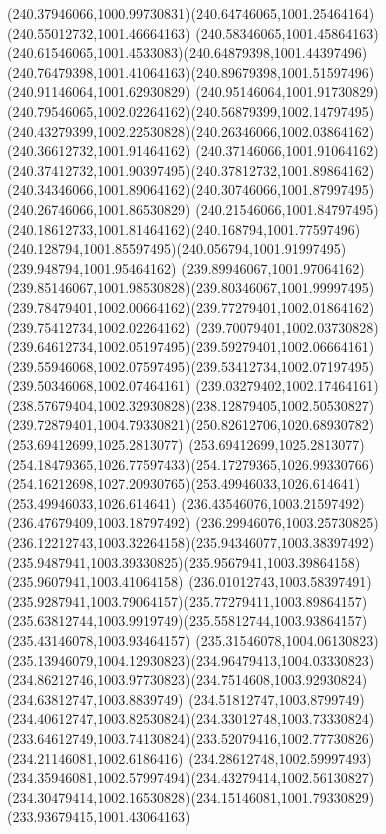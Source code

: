 {{		\curveto(240.37946066,1000.99730831)(240.64746065,1001.25464164)(240.55012732,1001.46664163)
		\curveto(240.58346065,1001.45864163)(240.61546065,1001.4533083)(240.64879398,1001.44397496)
		\curveto(240.76479398,1001.41064163)(240.89679398,1001.51597496)(240.91146064,1001.62930829)
		\curveto(240.95146064,1001.91730829)(240.79546065,1002.02264162)(240.56879399,1002.14797495)
		\curveto(240.43279399,1002.22530828)(240.26346066,1002.03864162)(240.36612732,1001.91464162)
		\curveto(240.37146066,1001.91064162)(240.37412732,1001.90397495)(240.37812732,1001.89864162)
		\curveto(240.34346066,1001.89064162)(240.30746066,1001.87997495)(240.26746066,1001.86530829)
		\curveto(240.21546066,1001.84797495)(240.18612733,1001.81464162)(240.168794,1001.77597496)
		\curveto(240.128794,1001.85597495)(240.056794,1001.91997495)(239.948794,1001.95464162)
		\curveto(239.89946067,1001.97064162)(239.85146067,1001.98530828)(239.80346067,1001.99997495)
		\curveto(239.78479401,1002.00664162)(239.77279401,1002.01864162)(239.75412734,1002.02264162)
		\curveto(239.70079401,1002.03730828)(239.64612734,1002.05197495)(239.59279401,1002.06664161)
		\curveto(239.55946068,1002.07597495)(239.53412734,1002.07197495)(239.50346068,1002.07464161)
		\curveto(239.03279402,1002.17464161)(238.57679404,1002.32930828)(238.12879405,1002.50530827)
		\curveto(239.72879401,1004.79330821)(250.82612706,1020.68930782)(253.69412699,1025.2813077)
		\curveto(253.69412699,1025.2813077)(254.18479365,1026.77597433)(254.17279365,1026.99330766)
		\curveto(254.16212698,1027.20930765)(253.49946033,1026.614641)(253.49946033,1026.614641)
		\lineto(236.43546076,1003.21597492)
		\lineto(236.47679409,1003.18797492)
		\curveto(236.29946076,1003.25730825)(236.12212743,1003.32264158)(235.94346077,1003.38397492)
		\curveto(235.9487941,1003.39330825)(235.9567941,1003.39864158)(235.9607941,1003.41064158)
		\curveto(236.01012743,1003.58397491)(235.9287941,1003.79064157)(235.77279411,1003.89864157)
		\curveto(235.63812744,1003.9919749)(235.55812744,1003.93864157)(235.43146078,1003.93464157)
		\curveto(235.31546078,1004.06130823)(235.13946079,1004.12930823)(234.96479413,1004.03330823)
		\curveto(234.86212746,1003.97730823)(234.7514608,1003.92930824)(234.63812747,1003.8839749)
		\curveto(234.51812747,1003.8799749)(234.40612747,1003.82530824)(234.33012748,1003.73330824)
		\curveto(233.64612749,1003.74130824)(233.52079416,1002.77730826)(234.21146081,1002.6186416)
		\curveto(234.28612748,1002.59997493)(234.35946081,1002.57997494)(234.43279414,1002.56130827)
		\curveto(234.30479414,1002.16530828)(234.15146081,1001.79330829)(233.93679415,1001.43064163)
}}
